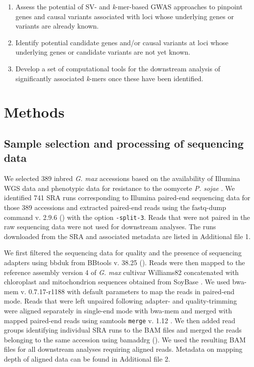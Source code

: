 \begin{enumerate}
	\item Assess the potential of SV- and \emph{k}-mer-based GWAS approaches to
		pinpoint genes and causal variants associated with loci whose
		underlying genes or variants are already known.
	\item Identify potential candidate genes and/or causal variants at loci
		whose underlying genes or candidate variants are not yet known.
	\item Develop a set of computational tools for the downstream analysis
		of significantly associated \emph{k}-mers once these have been
		identified.
\end{enumerate}

\section*{Methods}
\label{sv-gwas-methods}

\subsection*{Sample selection and processing of sequencing data}
\label{sv-gwas-sequencing-data}

We selected 389 inbred \emph{G. max} accessions based on the availability of
Illumina WGS data and phenotypic data for resistance to the oomycete \emph{P.
sojae} \citep{deronne2022}.  We identified 741 SRA runs corresponding to
Illumina paired-end sequencing data for those 389 accessions \citep[data from][]{zhou2015, valliyodan2016, fang2017, bayer2021}
and extracted paired-end reads using the fastq-dump command v. 2.9.6
(\citeauthor[][\url{https://github.com/ncbi/sra-tools}]{sratoolkit}) with the
option \texttt{-\-split-3}.
Reads that were not paired in the raw sequencing data were not used
for downstream analyses.  The runs downloaded from the SRA and associated
metadata are listed in Additional file 1.

We first filtered the sequencing data for quality and the presence of sequencing
adapters using bbduk from BBtools v. 38.25
(\citeauthor[][\url{https://sourceforge.net/projects/bbmap/}]{bbtools}). Reads
were then mapped to the reference assembly version 4 of \emph{G. max}
cultivar Williams82 \citep{valliyodan2019} concatenated with chloroplast
and mitochondrion sequences obtained from SoyBase \citep{grant2010}. We used
bwa-mem v. 0.7.17-r1188 \citep{li2009-bwa} with default parameters to map the
reads in paired-end mode. Reads that were left unpaired following adapter- and
quality-trimming were aligned separately in single-end mode with bwa-mem and
merged with mapped paired-end reads using samtools \texttt{merge}
v. 1.12 \citep{li2009-samtools}.  We then added read groups identifying
individual SRA runs to the BAM files and merged the reads belonging to the same
accession using bamaddrg
(\citeauthor[][\url{https://github.com/ekg/bamaddrg}]{bamaddrg}). We used the
resulting BAM files for all downstream analyses requiring aligned reads.
Metadata on mapping depth of aligned data can be found in Additional file 2.

